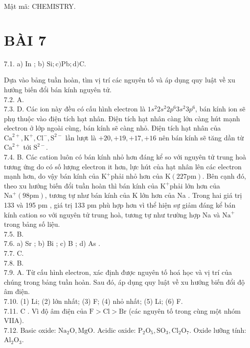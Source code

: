 \documentclass[10pt]{article}
\begin{document}
Mật mã: CHEMISTRY.

\section*{BÀI 7}
7.1. a) In ; b) $\mathrm{Si} ; \mathrm{c}) \mathrm{Pb} ; \mathrm{d}) \mathrm{C}$.

Dựa vào bảng tuần hoàn, tìm vị trí các nguyên tố và áp dụng quy luật về xu hướng biến đổi bán kính nguyên tử.\\
7.2. A.\\
7.3. D. Các ion này đều có cấu hình electron là $1 s^{2} 2 s^{2} 2 p^{6} 3 s^{2} 3 p^{6}$, bán kính ion sẽ phụ thuộc vào điện tích hạt nhân. Điện tích hạt nhân càng lớn càng hút mạnh electron ở lớp ngoài cùng, bán kính sẽ càng nhỏ. Điện tích hạt nhân của $\mathrm{Ca}^{2+}, \mathrm{K}^{+}, \mathrm{Cl}^{-}, \mathrm{S}^{2-}$ lần lượt là $+20,+19,+17,+16$ nên bán kính sẽ tăng dần từ $\mathrm{Ca}^{2+}$ tới $\mathrm{S}^{2-}$.\\
7.4. B. Các cation luôn có bán kính nhỏ hơn đáng kể so với nguyên tử trung hoà tương ứng do có số lượng electron it hơn, lực hút của hạt nhân lên các electron mạnh hơn, do vậy bán kính của $\mathrm{K}^{+}$phải nhỏ hơn của $\mathrm{K}(227 \mathrm{pm})$. Bên cạnh đó, theo xu hướng biến đổi tuần hoàn thì bán kính của $\mathrm{K}^{+}$phải lớn hơn của $\mathrm{Na}^{+}(98 \mathrm{pm})$, tương tự như bán kính của K lớn hơn của Na . Trong hai giá trị 133 và 195 pm , giá trị 133 pm phù hợp hơn vì thể hiện sự giảm đáng kể bán kính cation so với nguyên tử trung hoà, tương tự như trường hợp Na và $\mathrm{Na}^{+}$ trong bảng số liệu.\\
7.5. B.\\
7.6. a) Sr ; b) Bi ; c) B ; d) As .\\
7.7. C.\\
7.8. B.\\
7.9. A. Từ cấu hình electron, xác định được nguyên tố hoá học và vị trí của chúng trong bảng tuần hoàn. Sau đó, áp dụng quy luật về xu hướng biến đổi độ âm điện.\\
7.10. (1) Li; (2) lớn nhất; (3) F; (4) nhỏ nhất; (5) Li; (6) F.\\
7.11. C . Vì độ âm điện của $\mathrm{F}>\mathrm{Cl}>\mathrm{Br}$ (các nguyên tố trong cùng một nhóm VIIA).\\
7.12. Basic oxide: $\mathrm{Na}_{2} \mathrm{O}, \mathrm{MgO}$. Acidic oxide: $\mathrm{P}_{2} \mathrm{O}_{5}, \mathrm{SO}_{3}, \mathrm{Cl}_{2} \mathrm{O}_{7}$. Oxide lưỡng tính: $\mathrm{Al}_{2} \mathrm{O}_{3}$.\\
\end{document}

